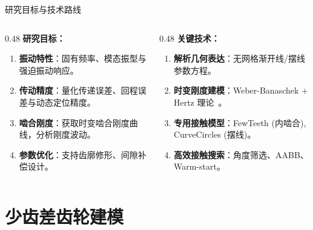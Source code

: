\documentclass[aspectratio=169,10pt,xcolor=table]{ctexbeamer}
\begin{document}
\begin{frame}{研究目标与技术路线}
  \begin{columns}[T]
    \begin{column}{0.48\textwidth}
      \textbf{研究目标：}
      \begin{enumerate}
        \item \textbf{振动特性}：固有频率、模态振型与强迫振动响应。
        \item \textbf{传动精度}：量化传递误差、回程误差与动态定位精度。
        \item \textbf{啮合刚度}：获取时变啮合刚度曲线，分析刚度波动。
        \item \textbf{参数优化}：支持齿廓修形、间隙补偿设计。
      \end{enumerate}
    \end{column}
    \begin{column}{0.48\textwidth}
      \textbf{关键技术：}
      \begin{enumerate}
        \item \textbf{解析几何表达}：无网格渐开线/摆线参数方程。
        \item \textbf{时变刚度建模}：Weber-Banaschek + Hertz 理论~\cite{johnson}。
        \item \textbf{专用接触模型}：FewTeeth (内啮合), CurveCircles (摆线)。
        \item \textbf{高效接触搜索}：角度筛选、AABB、Warm-start。
      \end{enumerate}
    \end{column}
  \end{columns}
\end{frame}

\section{少齿差齿轮建模}
\end{document}

